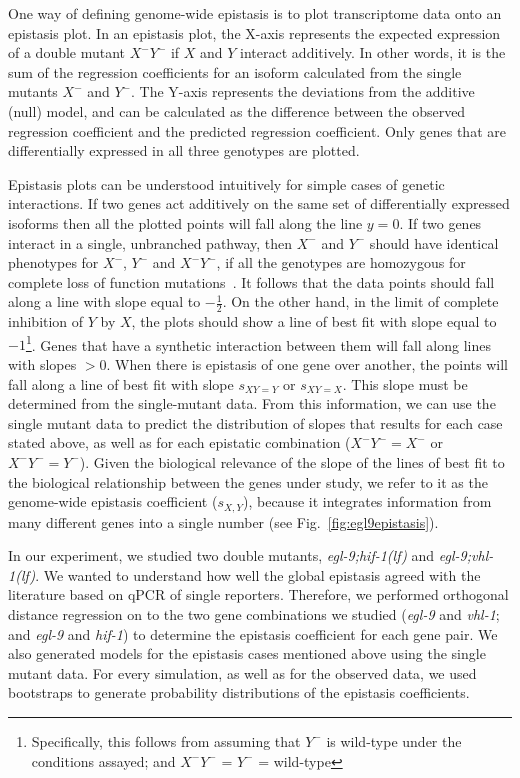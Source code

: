 \documentclass[9pt,twocolumn,twoside]{pnas-new}
\newcommand{\gene}[1]{\emph{#1}}
\newcommand{\eglvhl}{\emph{egl-9;vhl-1(lf)}}
\newcommand{\eglhif}{\emph{egl-9;hif-1(lf)}}
\begin{document}
One way of defining genome-wide epistasis is to plot transcriptome data onto
an epistasis plot. In an epistasis plot, the X-axis represents the
expected expression of a double mutant $X^-Y^-$ if $X$ and $Y$ interact additively.
In other words, it is the sum of the regression coefficients for an isoform
calculated from the single mutants $X^-$ and $Y^-$. The Y-axis represents the
deviations from the additive (null) model, and
can be calculated as the difference between the observed regression coefficient
and the predicted regression coefficient. Only genes that are differentially
expressed in all three genotypes are plotted.

Epistasis plots can be understood intuitively for simple cases of genetic
interactions. If two genes act additively on the same set of differentially expressed
isoforms then all the plotted points will fall along the line $y=0$.
If two genes interact in a single, unbranched pathway, then $X^-$ and $Y^-$ should
have identical phenotypes for $X^-$, $Y^-$ and $X^-Y^-$, if all the genotypes are
homozygous for complete loss of function mutations~\cite{Huang2006}. It follows that the
data points should fall along a line with slope equal to $-\frac{1}{2}$. On the
other hand, in the limit of complete inhibition of $Y$ by $X$, the plots should show
a line of best fit with slope equal to $-1$\footnote{Specifically, this follows
from assuming that $Y^-$ is wild-type under the conditions assayed; and
$X^-Y^-$ = $Y^-$ = wild-type}.
Genes that have a synthetic interaction between them will fall along lines
with slopes $>0$. When there is epistasis of one gene over another, the points will
fall along a line of best fit with slope $s_{XY=Y}$ or $s_{XY=X}$. This slope must
be determined from the single-mutant data.
From this information, we can use the single mutant data to
predict the distribution of slopes that results for each case stated above, as well
as for each epistatic combination ($X^-Y^-=X^-$ or $X^-Y^-=Y^-$). Given the biological
relevance of the slope of the lines of best fit to the biological relationship
between the genes under study, we refer to it as the genome-wide epistasis
coefficient ($s_{X, Y}$), because it integrates information from many different
genes into a single number (see Fig.~\ref{fig:egl9epistasis}).

In our experiment, we studied two double mutants, \eglhif{} and \eglvhl{}.
We wanted to understand how well the global epistasis agreed with the literature
based on qPCR of single reporters. Therefore, we performed orthogonal distance
regression on to the two gene combinations we studied (\gene{egl-9} and \gene{vhl-1};
and \gene{egl-9} and \gene{hif-1}) to determine the epistasis coefficient for each
gene pair. We also generated models for the epistasis cases mentioned above using
the single mutant data. For every simulation, as well as for the observed data,
we used bootstraps to generate probability distributions of the epistasis
coefficients.
\end{document}
